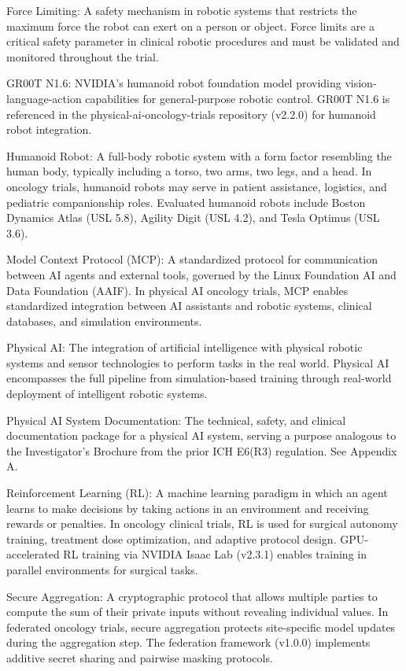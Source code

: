 \documentclass[11pt]{article}
\begin{document}
Force Limiting: A safety mechanism in robotic systems that restricts the maximum force the robot can exert on a person or object. Force limits are a critical safety parameter in clinical robotic procedures and must be validated and monitored throughout the trial.

GR00T N1.6: NVIDIA's humanoid robot foundation model providing vision-language-action capabilities for general-purpose robotic control. GR00T N1.6 is referenced in the physical-ai-oncology-trials repository (v2.2.0) for humanoid robot integration.

Humanoid Robot: A full-body robotic system with a form factor resembling the human body, typically including a torso, two arms, two legs, and a head. In oncology trials, humanoid robots may serve in patient assistance, logistics, and pediatric companionship roles. Evaluated humanoid robots include Boston Dynamics Atlas (USL 5.8), Agility Digit (USL 4.2), and Tesla Optimus (USL 3.6).

Model Context Protocol (MCP): A standardized protocol for communication between AI agents and external tools, governed by the Linux Foundation AI and Data Foundation (AAIF). In physical AI oncology trials, MCP enables standardized integration between AI assistants and robotic systems, clinical databases, and simulation environments.

Physical AI: The integration of artificial intelligence with physical robotic systems and sensor technologies to perform tasks in the real world. Physical AI encompasses the full pipeline from simulation-based training through real-world deployment of intelligent robotic systems.

Physical AI System Documentation: The technical, safety, and clinical documentation package for a physical AI system, serving a purpose analogous to the Investigator's Brochure from the prior ICH E6(R3) regulation. See Appendix A.

Reinforcement Learning (RL): A machine learning paradigm in which an agent learns to make decisions by taking actions in an environment and receiving rewards or penalties. In oncology clinical trials, RL is used for surgical autonomy training, treatment dose optimization, and adaptive protocol design. GPU-accelerated RL training via NVIDIA Isaac Lab (v2.3.1) enables training in parallel environments for surgical tasks.

Secure Aggregation: A cryptographic protocol that allows multiple parties to compute the sum of their private inputs without revealing individual values. In federated oncology trials, secure aggregation protects site-specific model updates during the aggregation step. The federation framework (v1.0.0) implements additive secret sharing and pairwise masking protocols.
\end{document}
